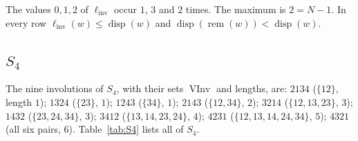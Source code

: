 \documentclass[11pt]{amsart}
\theoremstyle{definition}
\theoremstyle{remark}
\numberwithin{equation}{section}
\newcommand{\linv}{\ell_{\mathrm{inv}}}
\DeclareMathOperator{\rem}{rem}
\DeclareMathOperator{\disp}{disp}
\DeclareMathOperator{\VInv}{VInv}
\begin{document}
The values \(0,1,2\) of \(\linv\) occur \(1\), \(3\) and \(2\) times. The maximum is \(2=N-1\). In every row \(\linv(w)\le\disp(w)\) and \(\disp(\rem(w))<\disp(w)\).

\subsection{\texorpdfstring{\(S_4\)}{S4}}
The nine involutions of \(S_4\), with their sets \(\VInv\) and lengths, are: \(2134\) (\(\{12\}\), length \(1\)); \(1324\) (\(\{23\}\), \(1\)); \(1243\) (\(\{34\}\), \(1\)); \(2143\) (\(\{12,34\}\), \(2\)); \(3214\) (\(\{12,13,23\}\), \(3\)); \(1432\) (\(\{23,24,34\}\), \(3\)); \(3412\) (\(\{13,14,23,24\}\), \(4\)); \(4231\) (\(\{12,13,14,24,34\}\), \(5\)); \(4321\) (all six pairs, \(6\)). Table~\ref{tab:S4} lists all of \(S_4\).
\end{document}

